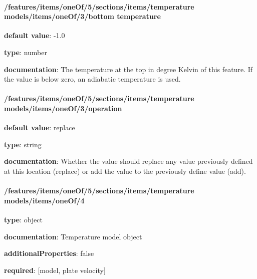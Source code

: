\begin{itemized}
\end{itemized}\paragraph{/features/items/oneOf/5/sections/items/temperature models/items/oneOf/3/bottom temperature} \begin{itemized}
\item {\bf default value}: -1.0
\item {\bf type}: number
\item {\bf documentation}: The temperature at the top in degree Kelvin of this feature. If the value is below zero, an adiabatic temperature is used.
\end{itemized}\paragraph{/features/items/oneOf/5/sections/items/temperature models/items/oneOf/3/operation} \begin{itemized}
\item {\bf default value}: replace
\item {\bf type}: string
\item {\bf documentation}: Whether the value should replace any value previously defined at this location (replace) or add the value to the previously define value (add).
\end{itemized}\paragraph{/features/items/oneOf/5/sections/items/temperature models/items/oneOf/4} \begin{itemized}
\item {\bf type}: object
\item {\bf documentation}: Temperature model object
\item {\bf additionalProperties}: false
\item {\bf required}: [model, plate velocity]\end{itemized}
